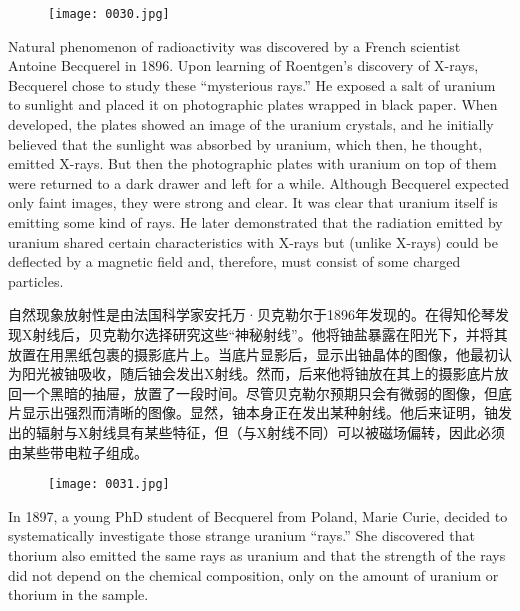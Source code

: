 \documentclass[dvipsnames, svgnames,a4paper,11pt]{article}
\begin{document}
\begin{figure}[htbp]
      \centering
      \texttt{[image: 0030.jpg]}
       \label{fig16}
\end{figure}

Natural phenomenon of radioactivity was discovered by a French scientist Antoine Becquerel in 1896. Upon learning of Roentgen’s discovery of X-rays, Becquerel chose to study these “mysterious rays.” He exposed a salt of uranium to sunlight and placed it on photographic plates wrapped in black paper. When developed, the plates showed an image of the uranium crystals, and he initially believed that the sunlight was absorbed by uranium, which then, he thought, emitted X-rays. But then the photographic plates with uranium on top of them were returned to a dark drawer and left for a while. Although Becquerel expected only faint images, they were strong and clear. It was clear that uranium itself is emitting some kind of rays. He later demonstrated that the radiation emitted by uranium shared certain characteristics with X-rays but (unlike X-rays) could be deflected by a magnetic field and, therefore, must consist of some charged particles.

自然现象放射性是由法国科学家安托万·贝克勒尔于1896年发现的。在得知伦琴发现X射线后，贝克勒尔选择研究这些“神秘射线”。他将铀盐暴露在阳光下，并将其放置在用黑纸包裹的摄影底片上。当底片显影后，显示出铀晶体的图像，他最初认为阳光被铀吸收，随后铀会发出X射线。然而，后来他将铀放在其上的摄影底片放回一个黑暗的抽屉，放置了一段时间。尽管贝克勒尔预期只会有微弱的图像，但底片显示出强烈而清晰的图像。显然，铀本身正在发出某种射线。他后来证明，铀发出的辐射与X射线具有某些特征，但（与X射线不同）可以被磁场偏转，因此必须由某些带电粒子组成。

\begin{figure}[htbp]
      \centering
      \texttt{[image: 0031.jpg]}
       \label{fig17}
\end{figure}

In 1897, a young PhD student of Becquerel from Poland, Marie Curie, decided to systematically investigate those strange uranium “rays.” She discovered that thorium also emitted the same rays as uranium and that the strength of the rays did not depend on the chemical composition, only on the amount of uranium or thorium in the sample.
\end{document}

